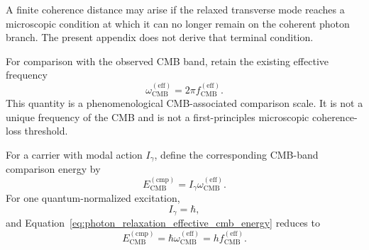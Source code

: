 A finite coherence distance may arise if the relaxed transverse mode reaches a
microscopic condition at which it can no longer remain on the coherent photon
branch. The present appendix does not derive that terminal condition.

For comparison with the observed CMB band, retain the existing effective
frequency
\begin{equation}
    \omega_{\mathrm{CMB}}^{(\mathrm{eff})}
    =
    2\pi
    f_{\mathrm{CMB}}^{(\mathrm{eff})}.
    \label{eq:photon_relaxation_effective_cmb_frequency}
\end{equation}
This quantity is a phenomenological CMB-associated comparison scale. It is
not a unique frequency of the CMB and is not a first-principles microscopic
coherence-loss threshold.

For a carrier with modal action
\(I_{\gamma}\),
define the corresponding CMB-band comparison energy by
\begin{equation}
    E_{\mathrm{CMB}}^{(\mathrm{cmp})}
    =
    I_{\gamma}
    \omega_{\mathrm{CMB}}^{(\mathrm{eff})}.
    \label{eq:photon_relaxation_effective_cmb_energy}
\end{equation}
For one quantum-normalized excitation,
\begin{equation}
    I_{\gamma}
    =
    \hbar,
    \label{eq:photon_relaxation_quantum_normalized_action}
\end{equation}
and Equation~\eqref{eq:photon_relaxation_effective_cmb_energy} reduces to
\[
    E_{\mathrm{CMB}}^{(\mathrm{cmp})}
    =
    \hbar
    \omega_{\mathrm{CMB}}^{(\mathrm{eff})}
    =
    h
    f_{\mathrm{CMB}}^{(\mathrm{eff})}.
\]

